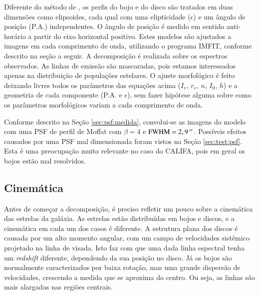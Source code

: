 Diferente do método de \citeauthor{Johnston2012}, os perfis do bojo e do disco
são tratados em duas dimensões como elipsoides, cada qual com uma elipticidade
($\epsilon$) e um ângulo de posição (P.A.) independentes. O ângulo de posição é
medido em sentido anti-horário a partir do eixo horizontal positivo. Estes
modelos são ajustados a imagens em cada comprimento de onda, utilizando o
programa IMFIT, conforme descrito na seção a seguir. A decomposição é realizada
sobre os espectros observados. As linhas de emissão são mascaradas, pois estamos
interessados apenas na distribuição de populações estelares.
O ajuste morfológico é feito deixando livres todos os parâmetros das equações
acima ($I_e$, $r_e$, $n$, $I_0$, $h$) e a geometria de cada componente (P.A. e
$\epsilon$), sem fazer hipótese alguma sobre como os parâmetros morfológicos
variam a cada comprimento de onda.

Conforme descrito na Seção \ref{sec:psf:medida}, convolui-se as imagens do
modelo com uma PSF de perfil de Moffat com $\beta=4$ e
$\mathrm{FWHM}=2,9\,^{\prime\prime}$. Possíveis efeitos causados por uma PSF mal
dimensionada foram vistos na Seção \ref{sec:test:psf}. Esta é uma preocupação
muito relevante no caso do CALIFA, pois em geral os bojos estão mal resolvidos.




\subsection{Cinemática}
\label{sec:Decomp:cinematica}

Antes de começar a decomposição, é preciso refletir um pouco sobre a cinemática
das estrelas da galáxia. As estrelas estão distribuídas em bojos e discos, e a
cinemática em cada um dos casos é diferente.
A estrutura plana dos discos é causada por um alto momento angular, com um campo
de velocidades sistêmico projetado na linha de visada. Isto faz com que uma dada
linha espectral tenha um {\em redshift} diferente, dependendo da sua posição no
disco. Já os bojos são normalmente caracterizados por baixa rotação, mas uma
grande dispersão de velocidades, crescendo a medida que se aproxima do centro.
Ou seja, as linhas são mais alargadas nas regiões centrais.


